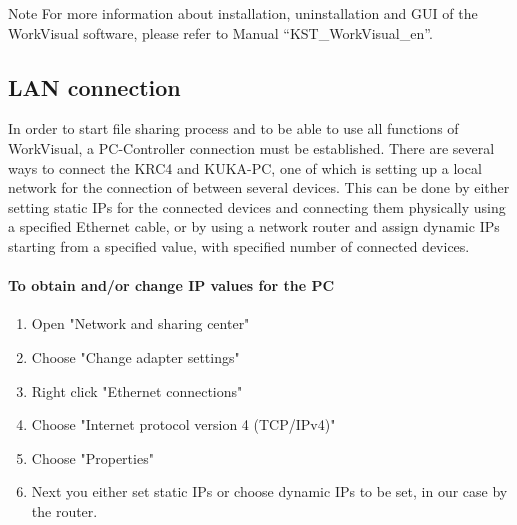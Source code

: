               \begin{mynotebox}{Note}
                	For more information about installation, uninstallation and GUI of the WorkVisual software, please refer to Manual “KST\_WorkVisual\_en”.
            \end{mynotebox}
            
            
			\subsection{LAN connection}
			In order to start file sharing process and to be able to use all functions of WorkVisual, a PC-Controller connection must be established. There are several ways to connect the KRC4 and KUKA-PC, one of which is setting up a local network for the connection of between several devices. This can be done by either setting static IPs for the connected devices and connecting them physically using a specified Ethernet cable, or by using a network router and assign dynamic IPs starting from a specified value, with specified number of connected devices. 
			\newline	
			\paragraph{To obtain and/or change IP values for the PC}
			\begin{enumerate}
				\item Open "Network and sharing center" 
				\item Choose "Change adapter settings"
				\item Right click "Ethernet connections"
				\item  Choose "Internet protocol version 4 (TCP/IPv4)"
				\item  Choose "Properties"
				\item Next you either set static IPs or choose dynamic IPs to be set, in our case by the router.
			\end{enumerate}
			
%					
        
